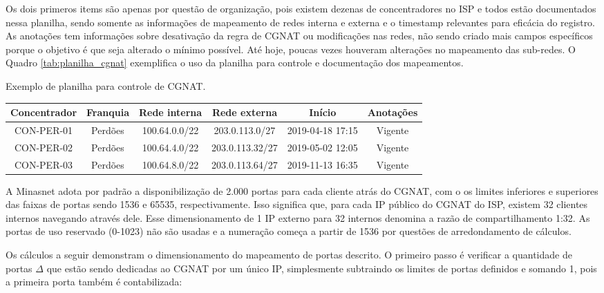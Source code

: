    Os dois primeros items são apenas por questão de organização, pois existem dezenas de concentradores no ISP e todos estão documentados nessa planilha, sendo somente as informações de mapeamento de redes interna e externa e o timestamp relevantes para eficácia do registro. As anotações tem informações sobre desativação da regra de CGNAT ou modificações nas redes, não sendo criado mais campos específicos porque o objetivo é que seja alterado o mínimo possível. Até hoje, poucas vezes houveram alterações no mapeamento das sub-redes. O Quadro \ref{tab:planilha_cgnat} exemplifica o uso da planilha para controle e documentação dos mapeamentos.

   \begin{quadro}[htb]
        \begin{center}
            \caption{Exemplo de planilha para controle de CGNAT.} 
            \label{tab:planilha_cgnat}
            \vspace{0.2cm}
        \footnotesize
            \begin{tabular}{|c|c|c|c|c|c|}
            \hline
            Concentrador & Franquia & Rede interna & Rede externa & Início & Anotações \\
            \hline
            \hline
            CON-PER-01 & Perdões & 100.64.0.0/22 & 203.0.113.0/27 & 2019-04-18 17:15 & Vigente \\
            CON-PER-02 & Perdões & 100.64.4.0/22 & 203.0.113.32/27 & 2019-05-02 12:05 & Vigente \\
            CON-PER-03 & Perdões & 100.64.8.0/22 & 203.0.113.64/27 & 2019-11-13 16:35 & Vigente \\
            \hline 
            \end{tabular}
        \end{center}
    \end{quadro}


    A Minasnet adota por padrão a disponibilização de 2.000 portas para cada cliente atrás do CGNAT, com o os limites inferiores e superiores das faixas de portas sendo 1536 e 65535, respectivamente. Isso significa que, para cada IP público do CGNAT do ISP, existem 32 clientes internos navegando através dele. Esse dimensionamento de 1 IP externo para 32 internos denomina a razão de compartilhamento 1:32. As portas de uso reservado (0-1023) não são usadas e a numeração começa a partir de 1536 por questões de arredondamento de cálculos.
    
    Os cálculos a seguir demonstram o dimensionamento do mapeamento de portas descrito. O primeiro passo é verificar a quantidade de portas $ \Delta $ que estão sendo dedicadas ao CGNAT por um único IP, simplesmente subtraindo os limites de portas definidos e somando 1, pois a primeira porta também é contabilizada:

